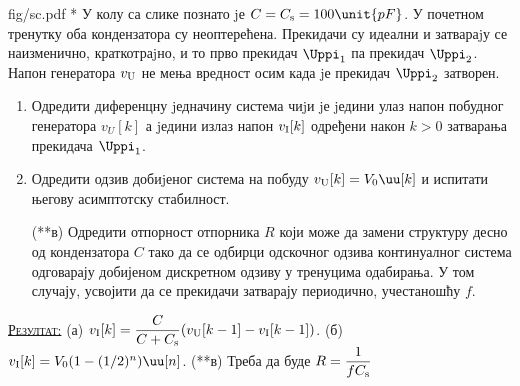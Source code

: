\begin{slikaDesno}{fig/sc.pdf}
    {\color{red}*}\PID
    У колу са слике познато jе $C = C_{\rm s} = 100\unit{pF}$. 
    У почетном тренутку оба кондензатора су неоптерећена.
Прекидачи су идеални и затвараjу се наизменично,
краткотраjно, и то прво прекидач $\Uppi_1$ па прекидач
$\Uppi_2$. Напон генератора $v_{\rm U}$ не мења вредност осим када
jе прекидач $\Uppi_2$ затворен.
\end{slikaDesno}
\begin{enumerate}[label=(\alph*)]
    \item Одредити диференцну jедначину система чиjи jе
    jедини улаз напон побудног генератора $v_U[k]$ а jедини излаз напон 
    $v_{\rm I}[k]$ одређени након $k > 0$ затварања прекидача $\Uppi_1$.
    \item Одредити одзив добиjеног система на побуду $v_{\rm U}[k] = V_0 \uu[k]$ и 
    испитати његову асимптотску стабилност.
    \item[({\color{red}**}в)] Одредити отпорност отпорника $R$ који може да замени 
    структуру десно од кондензатора $C$ тако да се одбирци одскочног 
    одзива континуалног система одговарају добијеном дискретном одзиву у тренуцима 
    одабирања. У том случају, усвојити да се прекидачи затварају периодично, 
    учестаношћу $f$.
\end{enumerate}
\vspace*{2mm}

\textsc{\underline{Резултат:}}
(а) $v_{\rm I}[k] = \dfrac{C}{C + C_{\rm s}}( v_{\rm U}[k-1] - v_{\rm I}[k-1] )$.
(б) $v_{\rm I}[k] = V_0( 1 - (1/2)^n ) \uu[n]$. 
({\color{red}**}в) Треба да буде $R = \dfrac{1}{fC_{\rm s}}$